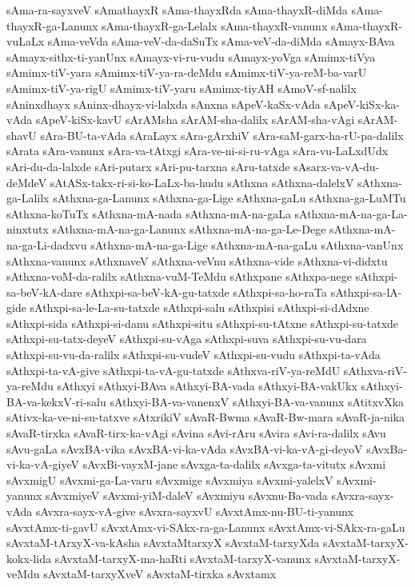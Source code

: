 {sAma-ra-sayxveV
sAmathayxR
sAma-thayxRda
sAma-thayxR-diMda
sAma-thayxR-ga-Lanunx
sAma-thayxR-ga-Lelalx
sAma-thayxR-vanunx
sAma-thayxR-vuLaLx
sAma-veVda
sAma-veV-da-daSuTx
sAma-veV-da-diMda
sAmayx-BAva
sAmayx-sithx-ti-yanUnx
sAmayx-vi-ru-vudu
sAmayx-yoVga
sAmimx-tiVya
sAmimx-tiV-yara
sAmimx-tiV-ya-ra-deMdu
sAmimx-tiV-ya-reM-ba-varU
sAmimx-tiV-ya-rigU
sAmimx-tiV-yaru
sAmimx-tiyAH
sAmoV-sf-nalilx
sAninxdhayx
sAninx-dhayx-vi-lalxda
sAnxna
sApeV-kaSx-vAda
sApeV-kiSx-ka-vAda
sApeV-kiSx-kavU
sArAMsha
sArAM-sha-dalilx
sArAM-sha-vAgi
sArAM-shavU
sAra-BU-ta-vAda
sAraLayx
sAra-gArxhiV
sAra-saM-garx-ha-rU-pa-dalilx
sArata
sAra-vanunx
sAra-va-tAtxgi
sAra-ve-ni-si-ru-vAga
sAra-vu-LaLxdUdx
sAri-du-da-lalxde
sAri-putarx
sAri-pu-tarxna
sAru-tatxde
sAsarx-va-vA-du-deMdeV
sAtASx-takx-ri-si-ko-LaLx-ba-hudu
sAthxna
sAthxna-dalelxV
sAthxna-ga-Lalilx
sAthxna-ga-Lanunx
sAthxna-ga-Lige
sAthxna-gaLu
sAthxna-ga-LuMTu
sAthxna-koTuTx
sAthxna-mA-nada
sAthxna-mA-na-gaLa
sAthxna-mA-na-ga-La-ninxtutx
sAthxna-mA-na-ga-Lanunx
sAthxna-mA-na-ga-Le-Dege
sAthxna-mA-na-ga-Li-dadxvu
sAthxna-mA-na-ga-Lige
sAthxna-mA-na-gaLu
sAthxna-vanUnx
sAthxna-vanunx
sAthxnaveV
sAthxna-veVnu
sAthxna-vide
sAthxna-vi-didxtu
sAthxna-voM-da-ralilx
sAthxna-vuM-TeMdu
sAthxpane
sAthxpa-nege
sAthxpi-sa-beV-kA-dare
sAthxpi-sa-beV-kA-gu-tatxde
sAthxpi-sa-ho-raTa
sAthxpi-sa-lA-gide
sAthxpi-sa-le-La-su-tatxde
sAthxpi-salu
sAthxpisi
sAthxpi-si-dAdxne
sAthxpi-sida
sAthxpi-si-danu
sAthxpi-situ
sAthxpi-su-tAtxne
sAthxpi-su-tatxde
sAthxpi-su-tatx-deyeV
sAthxpi-su-vAga
sAthxpi-suva
sAthxpi-su-vu-dara
sAthxpi-su-vu-da-ralilx
sAthxpi-su-vudeV
sAthxpi-su-vudu
sAthxpi-ta-vAda
sAthxpi-ta-vA-give
sAthxpi-ta-vA-gu-tatxde
sAthxva-riV-ya-reMdU
sAthxva-riV-ya-reMdu
sAthxyi
sAthxyi-BAva
sAthxyi-BA-vada
sAthxyi-BA-vakUkx
sAthxyi-BA-va-kekxV-ri-salu
sAthxyi-BA-va-vanenxV
sAthxyi-BA-va-vanunx
sAtitxvXka
sAtivx-ka-ve-ni-su-tatxve
sAtxrikiV
sAvaR-Bwma
sAvaR-Bw-mara
sAvaR-ja-nika
sAvaR-tirxka
sAvaR-tirx-ka-vAgi
sAvina
sAvi-rAru
sAvira
sAvi-ra-dalilx
sAvu
sAvu-gaLa
sAvxBA-vika
sAvxBA-vi-ka-vAda
sAvxBA-vi-ka-vA-gi-deyoV
sAvxBa-vi-ka-vA-giyeV
sAvxBi-vayxM-jane
sAvxga-ta-dalilx
sAvxga-ta-vitutx
sAvxmi
sAvxmigU
sAvxmi-ga-La-varu
sAvxmige
sAvxmiya
sAvxmi-yalelxV
sAvxmi-yanunx
sAvxmiyeV
sAvxmi-yiM-daleV
sAvxmiyu
sAvxnu-Ba-vada
sAvxra-sayx-vAda
sAvxra-sayx-vA-give
sAvxra-sayxvU
sAvxtAmx-nu-BU-ti-yanunx
sAvxtAmx-ti-gavU
sAvxtAmx-vi-SAkx-ra-ga-Lanunx
sAvxtAmx-vi-SAkx-ra-gaLu
sAvxtaM-tArxyX-va-kAsha
sAvxtaMtarxyX
sAvxtaM-tarxyXda
sAvxtaM-tarxyX-kokx-lida
sAvxtaM-tarxyX-ma-haRti
sAvxtaM-tarxyX-vanunx
sAvxtaM-tarxyX-veMdu
sAvxtaM-tarxyXveV
sAvxtaM-tirxka
sAvxtamx
}
